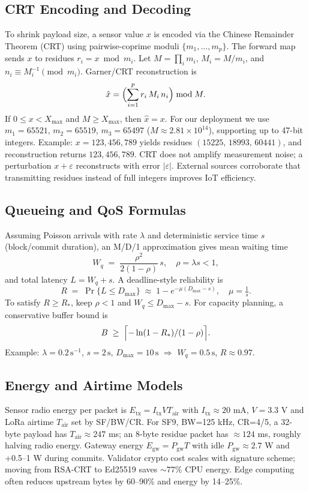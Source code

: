 \documentclass[12pt,onecolumn]{IEEEtran} %
\begin{document}
\subsection{CRT Encoding and Decoding}
To shrink payload size, a sensor value \(x\) is encoded via the Chinese Remainder Theorem (CRT) using pairwise-coprime moduli \(\{m_1,\ldots,m_p\}\). The forward map sends \(x\) to residues \(r_i = x \bmod m_i\). Let \(M=\prod_i m_i\), \(M_i=M/m_i\), and \(n_i \equiv M_i^{-1}\pmod{m_i}\). Garner/CRT reconstruction is
\begin{equation}
\hat{x} = \Bigl(\sum_{i=1}^p r_i\,M_i\,n_i\Bigr)\bmod M.
\end{equation}
If \(0\le x < X_{\max}\) and \(M\ge X_{\max}\), then \(\hat{x}=x\). For our deployment we use \(m_1=65521\), \(m_2=65519\), \(m_3=65497\) (\(M\approx2.81\times10^{14}\)), supporting up to 47-bit integers. Example: \(x=123{,}456{,}789\) yields residues \((15225,\,18993,\,60441)\), and reconstruction returns \(123{,}456{,}789\). CRT does not amplify measurement noise; a perturbation \(x+\varepsilon\) reconstructs with error \(|\varepsilon|\). External sources corroborate that transmitting residues instead of full integers improves IoT efficiency.

\subsection{Queueing and QoS Formulas}
Assuming Poisson arrivals with rate \(\lambda\) and deterministic service time \(s\) (block/commit duration), an M/D/1 approximation gives mean waiting time
\[
W_q \;=\; \frac{\rho^2}{2(1-\rho)}\,s,\quad \rho=\lambda s<1,
\]
and total latency \(L = W_q + s\). A deadline-style reliability is
\begin{equation}
R \;=\; \Pr\{L \le D_{\max}\} \;\approx\; 1 - e^{-\mu (D_{\max}-s)},\quad \mu=\tfrac{1}{s}.
\end{equation}
To satisfy \(R\ge R_\ast\), keep \(\rho<1\) and \(W_q \le D_{\max}-s\). For capacity planning, a conservative buffer bound is
\[
B \;\ge\; \Bigl\lceil -\ln(1-R_\ast)/(1-\rho)\Bigr\rceil.
\]
Example: \(\lambda=0.2\,\text{s}^{-1}\), \(s=2\,\text{s}\), \(D_{\max}=10\,\text{s}\) \(\Rightarrow\) \(W_q=0.5\,\text{s}\), \(R\approx0.97\).

\subsection{Energy and Airtime Models}
Sensor radio energy per packet is \(E_{\text{tx}} = I_{\text{tx}}VT_{\text{air}}\) with \(I_{\text{tx}}\!\approx\!20\) mA, \(V=3.3\) V and LoRa airtime \(T_{\text{air}}\) set by SF/BW/CR. For SF9, BW=125 kHz, CR=4/5, a 32-byte payload has \(T_{\text{air}}\approx247\) ms; an 8-byte residue packet has \(\approx124\) ms, roughly halving radio energy. Gateway energy \(E_{\text{gw}}=P_{\text{gw}}T\) with idle \(P_{\text{gw}}\approx2.7\) W and +0.5–1 W during commits. Validator crypto cost scales with signature scheme; moving from RSA-CRT to Ed25519 saves \(\sim77\%\) CPU energy. Edge computing often reduces upstream bytes by 60–90\% and energy by 14–25\%.
\end{document}
